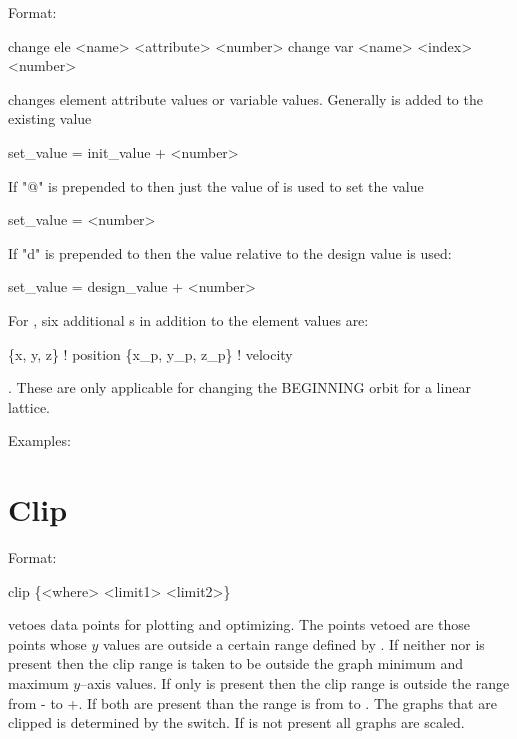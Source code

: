 Format:
\begin{example}
  change ele <name> <attribute> <number>
  change var <name> <index> <number>
\end{example}

\vskip 0.2in
 changes element attribute values or variable values. Generally
 is added to the existing value
\begin{example}
  set_value = init_value + <number>
\end{example}
If "@" is prepended to   then just the value of  is used
to set the value
\begin{example}
  set_value = <number>
\end{example}
If "d" is prepended to   then the value relative to the design
value is used:
\begin{example}
  set_value = design_value + <number>
\end{example}

For , six additional
s in addition to the element values are:
\begin{example}
  \{x, y, z\}           ! position 
  \{x\_p, y\_p, z\_p\}  ! velocity
\end{example}.
These are only applicable for changing the BEGINNING orbit for a linear lattice.

Examples:


\section{Clip}
\label{s:clip}

Format:
\begin{example}
  clip \{<where> <limit1> <limit2>\}
\end{example}

\vskip 0.2in  vetoes data points for plotting and
optimizing. The points vetoed are those points whose $y$ values are
outside a certain range defined by  . If
neither  nor  is present then the clip range
is taken to be outside the graph minimum and maximum $y$--axis
values. If only  is present then the clip range is
outside the range from - to +. If both are
present than the range is from  to .  The
graphs that are clipped is determined by the  switch.  If
 is not present all graphs are scaled.

